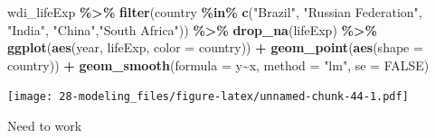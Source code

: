 \documentclass[
  xelatex, ja=standard]{bxjsbook}
\newenvironment{Shaded}{\begin{snugshade}}{\end{snugshade}}
\newcommand{\AttributeTok}[1]{\textcolor[rgb]{0.13,0.29,0.53}{#1}}
\newcommand{\ConstantTok}[1]{\textcolor[rgb]{0.56,0.35,0.01}{#1}}
\newcommand{\FunctionTok}[1]{\textcolor[rgb]{0.13,0.29,0.53}{\textbf{#1}}}
\newcommand{\NormalTok}[1]{#1}
\newcommand{\SpecialCharTok}[1]{\textcolor[rgb]{0.81,0.36,0.00}{\textbf{#1}}}
\newcommand{\StringTok}[1]{\textcolor[rgb]{0.31,0.60,0.02}{#1}}
\theoremstyle{definition}
\theoremstyle{definition}
\theoremstyle{definition}
\theoremstyle{definition}
\theoremstyle{remark}
\begin{document}
\begin{Shaded}
\begin{Highlighting}[]
\NormalTok{wdi\_lifeExp }\SpecialCharTok{\%\textgreater{}\%} \FunctionTok{filter}\NormalTok{(country }\SpecialCharTok{\%in\%} \FunctionTok{c}\NormalTok{(}\StringTok{"Brazil"}\NormalTok{, }\StringTok{"Russian Federation"}\NormalTok{, }\StringTok{"India"}\NormalTok{, }\StringTok{"China"}\NormalTok{,}\StringTok{"South Africa"}\NormalTok{)) }\SpecialCharTok{\%\textgreater{}\%} \FunctionTok{drop\_na}\NormalTok{(lifeExp) }\SpecialCharTok{\%\textgreater{}\%}
  \FunctionTok{ggplot}\NormalTok{(}\FunctionTok{aes}\NormalTok{(year, lifeExp, }\AttributeTok{color =}\NormalTok{ country)) }\SpecialCharTok{+} \FunctionTok{geom\_point}\NormalTok{(}\FunctionTok{aes}\NormalTok{(}\AttributeTok{shape =}\NormalTok{ country)) }\SpecialCharTok{+} \FunctionTok{geom\_smooth}\NormalTok{(}\AttributeTok{formula =}\NormalTok{ y}\SpecialCharTok{\textasciitilde{}}\NormalTok{x, }\AttributeTok{method =} \StringTok{"lm"}\NormalTok{, }\AttributeTok{se =} \ConstantTok{FALSE}\NormalTok{)}
\end{Highlighting}
\end{Shaded}

\texttt{[image: 28-modeling\_files/figure-latex/unnamed-chunk-44-1.pdf]}

Need to work
\end{document}
